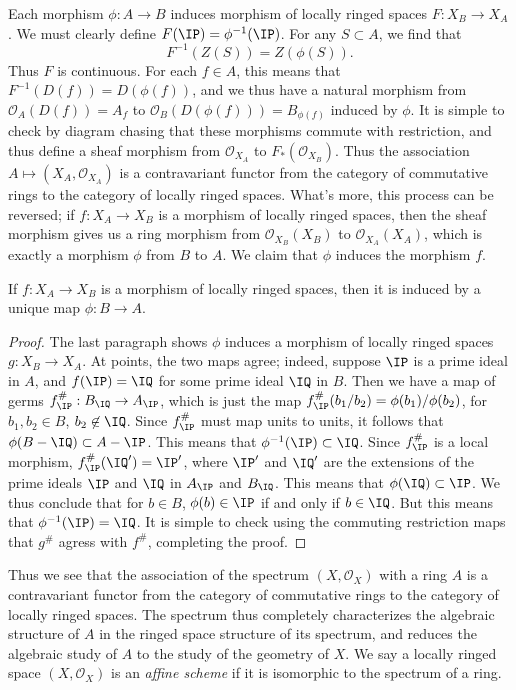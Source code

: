 Each morphism $\phi: A \to B$ induces morphism of locally ringed spaces $F: X_B \to X_A$. We must clearly define $F(\IP) = \phi^{-1}(\IP)$. For any $S \subset A$, we find that
%
\[ F^{-1}(Z(S)) = Z(\phi(S)). \]
%
Thus $F$ is continuous. For each $f \in A$, this means that $F^{-1}(D(f)) = D(\phi(f))$, and we thus have a natural morphism from $\mathcal{O}_A(D(f)) = A_f$ to $\mathcal{O}_B(D(\phi(f))) = B_{\phi(f)}$ induced by $\phi$. It is simple to check by diagram chasing that these morphisms commute with restriction, and thus define a sheaf morphism from $\mathcal{O}_{X_A}$ to $F_*(\mathcal{O}_{X_B})$. Thus the association $A \mapsto (X_A, \mathcal{O}_{X_A})$ is a contravariant functor from the category of commutative rings to the category of locally ringed spaces. What's more, this process can be reversed; if $f: X_A \to X_B$ is a morphism of locally ringed spaces, then the sheaf morphism gives us a ring morphism from $\mathcal{O}_{X_B}(X_B) $ to $\mathcal{O}_{X_A}(X_A)$, which is exactly a morphism $\phi$ from $B$ to $A$. We claim that $\phi$ induces the morphism $f$.

\begin{theorem}
    If $f: X_A \to X_B$ is a morphism of locally ringed spaces, then it is induced by a unique map $\phi: B \to A$.
\end{theorem}
\begin{proof}
    The last paragraph shows $\phi$ induces a morphism of locally ringed spaces $g: X_B \to X_A$. At points, the two maps agree; indeed, suppose $\IP$ is a prime ideal in $A$, and $f(\IP) = \IQ$ for some prime ideal $\IQ$ in $B$. Then we have a map of germs $f^\#_{\IP}: B_{\IQ} \to A_{\IP}$, which is just the map $f^\#_{\IP}(b_1/b_2) = \phi(b_1)/\phi(b_2)$, for $b_1,b_2 \in B$, $b_2 \not \in \IQ$. Since $f^\#_{\IP}$ must map units to units, it follows that $\phi(B - \IQ) \subset A - \IP$. This means that $\phi^{-1}(\IP) \subset \IQ$. Since $f^\#_{\IP}$ is a local morphism, $f^\#_{\IP}(\IQ') = \IP'$, where $\IP'$ and $\IQ'$ are the extensions of the prime ideals $\IP$ and $\IQ$ in $A_{\IP}$ and $B_{\IQ}$. This means that $\phi(\IQ) \subset \IP$. We thus conclude that for $b \in B$, $\phi(b) \in \IP$ if and only if $b \in \IQ$. But this means that $\phi^{-1}(\IP) = \IQ$. It is simple to check using the commuting restriction maps that $g^\#$ agress with $f^\#$, completing the proof.
\end{proof}

Thus we see that the association of the spectrum $(X,\mathcal{O}_X)$ with a ring $A$ is a contravariant functor from the category of commutative rings to the category of locally ringed spaces. The spectrum thus completely characterizes the algebraic structure of $A$ in the ringed space structure of its spectrum, and reduces the algebraic study of $A$ to the study of the geometry of $X$. We say a locally ringed space $(X,\mathcal{O}_X)$ is an \emph{affine scheme} if it is isomorphic to the spectrum of a ring.

